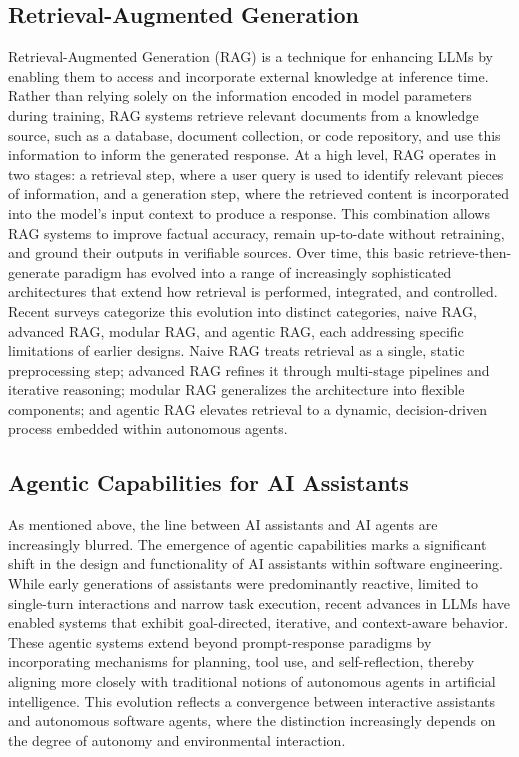 \subsection{Retrieval-Augmented Generation} \label{sec:related-work:RAG}
Retrieval-Augmented Generation (RAG) is a technique for enhancing LLMs by enabling them to access and incorporate external knowledge at inference time. \cite{lewis2020retrieval} Rather than relying solely on the information encoded in model parameters during training, RAG systems retrieve relevant documents from a knowledge source, such as a database, document collection, or code repository, and use this information to inform the generated response. At a high level, RAG operates in two stages: a retrieval step, where a user query is used to identify relevant pieces of information, and a generation step, where the retrieved content is incorporated into the model's input context to produce a response. This combination allows RAG systems to improve factual accuracy, remain up-to-date without retraining, and ground their outputs in verifiable sources. Over time, this basic retrieve-then-generate paradigm has evolved into a range of increasingly sophisticated architectures that extend how retrieval is performed, integrated, and controlled. Recent surveys categorize this evolution into distinct categories, naive RAG, advanced RAG, modular RAG, and agentic RAG, each addressing specific limitations of earlier designs. \cite{gao2023retrieval, singh2025agentic} Naive RAG treats retrieval as a single, static preprocessing step; advanced RAG refines it through multi-stage pipelines and iterative reasoning; modular RAG generalizes the architecture into flexible components; and agentic RAG elevates retrieval to a dynamic, decision-driven process embedded within autonomous agents.

\subsection{Agentic Capabilities for AI Assistants}
As mentioned above, the line between AI assistants and AI agents are increasingly blurred. The emergence of agentic capabilities marks a significant shift in the design and functionality of AI assistants within software engineering. While early generations of assistants were predominantly reactive, limited to single-turn interactions and narrow task execution, recent advances in LLMs have enabled systems that exhibit goal-directed, iterative, and context-aware behavior. These agentic systems extend beyond prompt-response paradigms by incorporating mechanisms for planning, tool use, and self-reflection, thereby aligning more closely with traditional notions of autonomous agents in artificial intelligence. This evolution reflects a convergence between interactive assistants and autonomous software agents, where the distinction increasingly depends on the degree of autonomy and environmental interaction.

